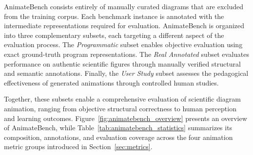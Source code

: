 \documentclass{article} %
\begin{document}
AnimateBench consists entirely of manually curated diagrams that are excluded from the training corpus. Each benchmark instance is annotated with the intermediate representations required for evaluation. AnimateBench is organized into three complementary subsets, each targeting a different aspect of the evaluation process. The \emph{Programmatic} subset enables objective evaluation using exact ground-truth program representations. The \emph{Real Annotated} subset evaluates performance on authentic scientific figures through manually verified structural and semantic annotations. Finally, the \emph{User Study} subset assesses the pedagogical effectiveness of generated animations through controlled human studies.

Together, these subsets enable a comprehensive evaluation of scientific diagram animation, ranging from objective structural correctness to human perception and learning outcomes. Figure~\ref{fig:animatebench_overview} presents an overview of AnimateBench, while Table~\ref{tab:animatebench_statistics} summarizes its composition, annotations, and evaluation coverage across the four animation metric groups introduced in Section~\ref{sec:metrics}.





\end{document}
